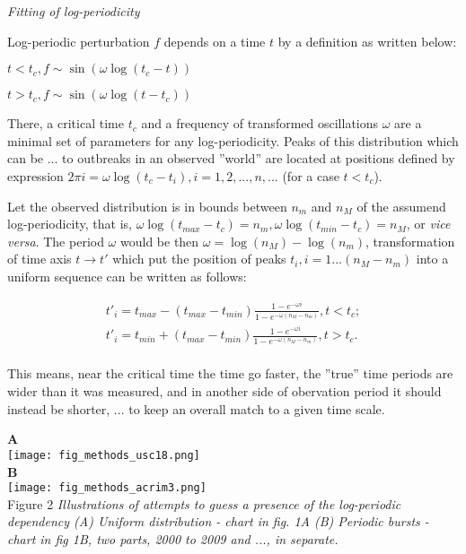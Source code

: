 \documentclass[a4paper]{article}
\begin{document}
\textit{Fitting of log-periodicity}

Log-periodic perturbation $f$ depends on a time $t$ by a definition as written below: 

$t < t_c, f \sim \sin( \omega \log( t_c - t ) )$

$t > t_c, f \sim \sin( \omega \log( t - t_c ) )$

There, a critical time $t_c$ and a frequency of transformed oscillations $\omega$ are a minimal set of parameters for any log-periodicity. Peaks of this distribution which can be ... to outbreaks in an observed ''world'' are located at positions defined by expression $ 2 \pi i =  \omega \log( t_c - t_i ), i = 1, 2,  ..., n, ... $ (for a case $t < t_c$).

Let the observed distribution is in bounds between $n_m$ and $n_M$ of the assumend log-periodicity, that is, $\omega \log( t_{max} - t_c )  = n_m, \omega \log( t_{min} - t_c ) = n_M$, or \textit{vice versa}. The period $\omega$ would be then $\omega = \log( n_M ) - \log( n_m ) $, transformation of time axis $t \to t'$ which put the position of peaks $t_i, i = 1 ... (n_M - n_m)$ into a uniform sequence can be written as follows:

\begin{eqnarray}
t'_i = t_{max} - ( t_{max} - t_{min} )\frac{ 1 - e^{ - \omega i } }{ 1 - e^{ - \omega (n_M - n_m) } }, t < t_c; \nonumber\\
t'_i = t_{min} + ( t_{max} - t_{min} )\frac{ 1 - e^{ - \omega i } }{ 1 - e^{ - \omega (n_M - n_m) } }, t > t_c. \\
\end{eqnarray}

This means, near the critical time the time go faster, the ''true'' time periods are wider than it was measured, and in another side of obervation period it should instead be shorter, ... to keep an overall match to a given time scale. 

\noindent
{\large{\textbf{A}}}\\
\texttt{[image: fig\_methods\_usc18.png]}\\
\vskip 12pt
\noindent
{\large{\textbf{B}}}\\
\texttt{[image: fig\_methods\_acrim3.png]}\\
\vskip 12pt
Figure 2 \textit{Illustrations of attempts to guess a presence of the log-periodic dependency (A) Uniform distribution - chart in fig. 1A (B) Periodic bursts - chart in fig 1B, two parts, 2000 to 2009 and ..., in separate.}
\vskip 12pt
\end{document}
